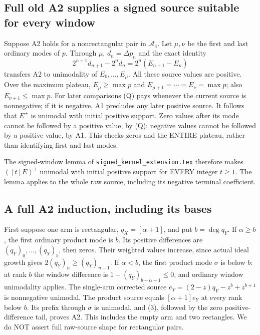 \subsection{Full old A2 supplies a signed source suitable for every window}
Suppose A2 holds for a nonrectangular pair in $\mathcal A_4$.
Let $\mu,\nu$ be the first and last ordinary modes of $p$.
Through $\mu$, $d_n=\Delta p_n$ and the exact identity
\[
 2^{n+1}d_{n+1}-2^nd_n=2^n(E_{n+1}-E_n)          \tag{3}
\]
transfers A2 to unimodality of $E_0,\ldots,E_\mu$.
All these source values are positive. Over the maximum plateau,
$E_\mu\ge\max p$ and $E_{\mu+1}=\cdots=E_\nu=\max p$;
also $E_{\nu+1}\le\max p$. For later comparisons (Q) pays whenever
the current source is nonnegative; if it is negative, A1 precludes
any later positive source. It follows that $E^+$ is unimodal with
initial positive support. Zero values after its mode cannot be
followed by a positive value, by (Q); negative values cannot be
followed by a positive value, by A1. This checks zeros and the
ENTIRE plateau, rather than identifying first and last modes.

The signed-window lemma of \texttt{signed\_kernel\_extension.tex}
therefore makes $([t]E)^+$ unimodal with initial positive support
for EVERY integer $t\ge1$. The lemma applies to the whole raw
source, including its negative terminal coefficient.

\subsection{A full A2 induction, including its bases}
First suppose one arm is rectangular, $q_X=[\alpha+1]$, and put
$b=\deg q_Y$. If $\alpha\ge b$, the first ordinary product mode is
$b$. Its positive differences are $(q_Y)_0,\ldots,(q_Y)_b$, then
zeros. Their weighted values increase, since actual ideal growth
gives $2(q_Y)_n\ge(q_Y)_{n-1}$. If $\alpha<b$, the first product
mode $\sigma$ is below $b$: at rank $b$ the window difference is
$1-(q_Y)_{b-\alpha-1}\le0$, and ordinary window unimodality applies.
The single-arm corrected source
$e_Y=(2-z)q_Y-z^b+z^{b+1}$ is nonnegative unimodal.
The product source equals $[\alpha+1]e_Y$ at every rank below $b$.
Its prefix through $\sigma$ is unimodal, and (3), followed by the
zero positive-difference tail, proves A2. This includes the empty
arm and two rectangles. We do NOT assert full raw-source shape
for rectangular pairs.

